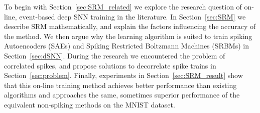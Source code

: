 To begin with \DIFaddbegin {}\DIFaddend Section~\ref{sec:SRM_related} \DIFdelbegin \DIFdel{, }\DIFdelend we explore the research question of on-line, event-based deep SNN training in the literature.
In Section~\ref{sec:SRM} we describe SRM mathematically, and explain the factors influencing the accuracy of the method.
We then argue why the learning algorithm is suited to train spiking Autoencoders (SAEs) and Spiking Restricted Boltzmann Machines (SRBMs) in Section~\ref{sec:dSNN}.
During the research we encountered the problem of correlated spikes, and propose solutions to decorrelate spike trains in Section~\ref{sec:problem}.
Finally, experiments in Section~\ref{sec:SRM_result} show that this on-line training method achieves better performance than existing algorithms and approaches the same, sometimes superior performance of the equivalent non-spiking methods \DIFdelbegin {}\DIFdelend \DIFaddbegin {}\DIFaddend on the MNIST dataset.



